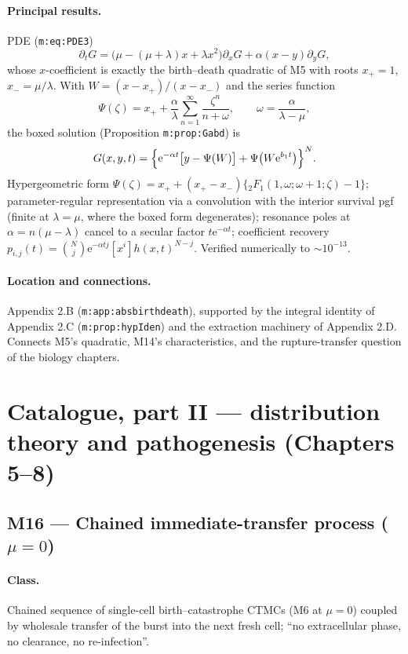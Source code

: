\documentclass[11pt,a4paper]{article}
\newcommand{\ee}{\mathrm{e}}
\begin{document}
\paragraph{Principal results.} PDE (\texttt{m:eq:PDE3})
\[
\partial_tG=\bigl(\mu-(\mu+\lambda)x+\lambda x^2\bigr)\partial_xG
+\alpha(x-y)\partial_yG ,
\]
whose $x$-coefficient is exactly the birth--death quadratic of M5 with
roots $x_+=1$, $x_-=\mu/\lambda$. With
$W=(x-x_+)/(x-x_-)$ and the series function
\[
\Psi(\zeta)=x_++\frac{\alpha}{\lambda}\sum_{n=1}^{\infty}\frac{\zeta^n}{n+\omega},
\qquad \omega=\frac{\alpha}{\lambda-\mu},
\]
the boxed solution (Proposition \texttt{m:prop:Gabd}) is
\[
G(x,y,t)=\Bigl\{\ee^{-\alpha t}\bigl[y-\Psi(W)\bigr]
+\Psi\bigl(W\ee^{b_1t}\bigr)\Bigr\}^{N}.
\]
Hypergeometric form $\Psi(\zeta)=x_++(x_+-x_-)\{{}_2F_1(1,\omega;\omega+1;
\zeta)-1\}$; parameter-regular representation via a convolution with the
interior survival pgf (finite at $\lambda=\mu$, where the boxed form
degenerates); resonance poles at $\alpha=n(\mu-\lambda)$ cancel to a secular
factor $t\ee^{-\alpha t}$; coefficient recovery $p_{i,j}(t)
=\binom Nj\ee^{-\alpha tj}[x^i]h(x,t)^{N-j}$. Verified numerically to
$\sim10^{-13}$.

\paragraph{Location and connections.} Appendix 2.B
(\texttt{m:app:absbirthdeath}), supported by the integral identity of
Appendix 2.C (\texttt{m:prop:hypIden}) and the extraction machinery of
Appendix 2.D. Connects M5's quadratic, M14's characteristics, and the
rupture-transfer question of the biology chapters.

\section{Catalogue, part II --- distribution theory and pathogenesis (Chapters 5--8)}

\subsection{M16 --- Chained immediate-transfer process ($\mu=0$)}
\label{sec:M16}

\paragraph{Class.} Chained sequence of single-cell birth--catastrophe
CTMCs (M6 at $\mu=0$) coupled by wholesale transfer of the burst into the
next fresh cell; ``no extracellular phase, no clearance, no re-infection''.
\end{document}
